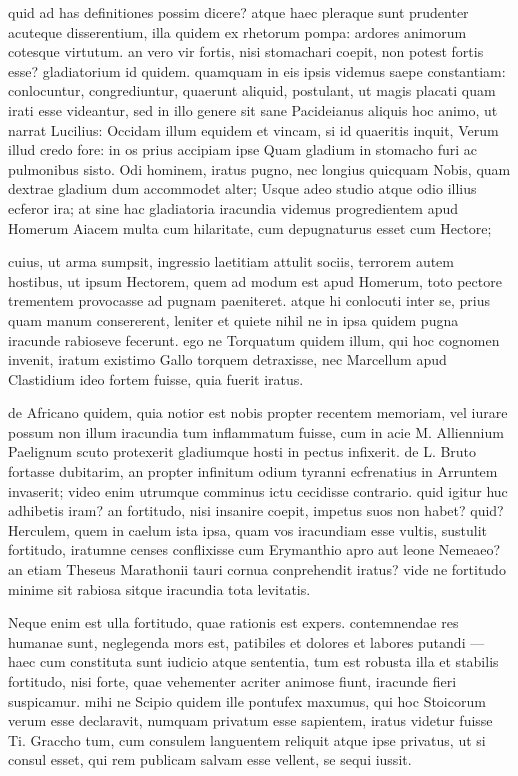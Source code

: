  quid ad has definitiones possim dicere? atque haec pleraque sunt prudenter acuteque disserentium, illa quidem ex rhetorum pompa: ardores animorum cotesque virtutum. an vero vir fortis, nisi stomachari coepit, non potest fortis esse? gladiatorium id quidem. quamquam in eis ipsis videmus saepe constantiam: conlocuntur, congrediuntur, quaerunt aliquid, postulant, ut magis placati quam irati esse videantur, sed in illo genere sit sane Pacideianus aliquis hoc animo, ut narrat Lucilius: Occidam illum equidem et vincam, si id quaeritis inquit, Verum illud credo fore: in os prius accipiam ipse Quam gladium in stomacho furi ac pulmonibus sisto. Odi hominem, iratus pugno, nec longius quicquam Nobis, quam dextrae gladium dum accommodet alter; Usque adeo studio atque odio illius ecferor ira; at sine hac gladiatoria iracundia videmus progredientem apud Homerum Aiacem multa cum hilaritate, cum depugnaturus esset cum Hectore;

 cuius, ut arma sumpsit, ingressio laetitiam attulit sociis, terrorem autem hostibus, ut ipsum Hectorem, quem ad modum est apud Homerum, toto pectore trementem provocasse ad pugnam paeniteret. atque hi conlocuti inter se, prius quam manum consererent, leniter et quiete nihil ne in ipsa quidem pugna iracunde rabioseve fecerunt. ego ne Torquatum quidem illum, qui hoc cognomen invenit, iratum existimo Gallo torquem detraxisse, nec Marcellum apud Clastidium ideo fortem fuisse, quia fuerit iratus.

 de Africano quidem, quia notior est nobis propter recentem memoriam, vel iurare possum non illum iracundia tum inflammatum fuisse, cum in acie M. Alliennium Paelignum scuto protexerit gladiumque hosti in pectus infixerit. de L. Bruto fortasse dubitarim, an propter infinitum odium tyranni ecfrenatius in Arruntem invaserit; video enim utrumque comminus ictu cecidisse contrario. quid igitur huc adhibetis iram? an fortitudo, nisi insanire coepit, impetus suos non habet? quid? Herculem, quem in caelum ista ipsa, quam vos iracundiam esse vultis, sustulit fortitudo, iratumne censes conflixisse cum Erymanthio apro aut leone Nemeaeo? an etiam Theseus Marathonii tauri cornua conprehendit iratus? vide ne fortitudo minime sit rabiosa sitque iracundia tota levitatis.

 Neque enim est ulla fortitudo, quae rationis est expers. contemnendae res humanae sunt, neglegenda mors est, patibiles et dolores et labores putandi — haec cum constituta sunt iudicio atque sententia, tum est robusta illa et stabilis fortitudo, nisi forte, quae vehementer acriter animose fiunt, iracunde fieri suspicamur. mihi ne Scipio quidem ille pontufex maxumus, qui hoc Stoicorum verum esse declaravit, numquam privatum esse sapientem, iratus videtur fuisse Ti. Graccho tum, cum consulem languentem reliquit atque ipse privatus, ut si consul esset, qui rem publicam salvam esse vellent, se sequi iussit.

